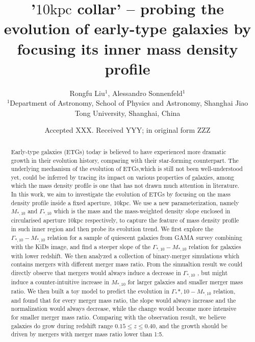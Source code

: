 \documentclass[fleqn,usenatbib]{mnras}
\title[Evolution of mass density profile]{'$10\text{kpc}$ collar' -- probing the evolution of early-type galaxies by focusing its inner mass density profile}
\author[Rongfu Liu et al.]{
Rongfu Liu$^{1}$, 
Alessandro Sonnenfeld$^{1}$\\
$^{1}$Department of Astronomy, School of Physics and Astronomy, Shanghai Jiao Tong University, Shanghai, China
}
\date{Accepted XXX. Received YYY; in original form ZZZ}
\begin{document}
\label{firstpage}
\pagerange{\pageref{firstpage}--\pageref{lastpage}}
\maketitle

\begin{abstract}
Early-type galaxies (ETGs) today is believed to have experienced more dramatic growth in their evolution history, comparing with their star-forming counterpart. The underlying mechanism of the evolution of ETGs,which is still not been well-understood yet, could be inferred by tracing its impact on various properties of galaxies, among which the mass density profile is one that has not drawn much attention in literature. 
In this work, we aim to investigate the evolution of ETGs by focusing on the mass density profile inside a fixed aperture, $10$kpc. 
We use a new parameterization, namely $M_{*,10}$ and $\Gamma_{*,10}$ which is the mass and the mass-weighted density slope enclosed in circularised aperture $10$kpc respectively, to capture the feature of mass density profile in such inner region and then probe its evolution trend. We first explore the $\Gamma_{*,10} - M_{*,10}$ relation for a sample of quiescent galaxies from GAMA survey combining with the KiDs image, and find a steeper slope of the $\Gamma_{*,10} - M_{*,10}$ relation for galaxies with lower redshift. We then analyzed a collection of binary-merger simulations which contains mergers with different merger mass ratio. From the simualtion result we could directly observe that mergers would always induce a decrease in $\Gamma_{*,10}$ , but might induce a counter-intuitive increase in $M_{*,10}$ for larger galaxies and smaller merger mass ratio. We then built a toy model to predict the evolution in $\Gamma_*{*,10} - M_{*,10}$ relation, and found that for every merger mass ratio, the slope would always increase and the normalization would always decrease, while the change would become more intensive for smaller merger mass ratio. Comparing with the observation result, we believe galaxies do grow during redshift range $0.15 \leq z \leq 0.40$, and the growth should be driven by mergers with merger mass ratio lower than 1:5.
\end{abstract}
\end{document}
